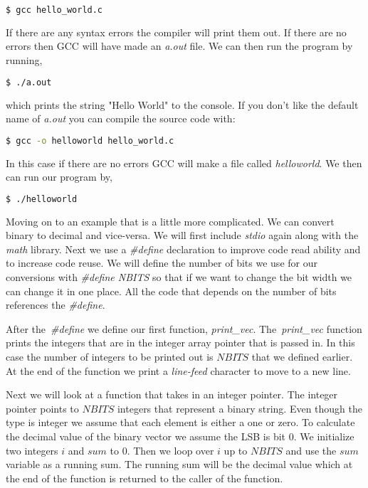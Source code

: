 \begin{lstlisting}[language=bash]
    $ gcc hello_world.c 
\end{lstlisting}

If there are any syntax errors the compiler will print them out. If there are no errors then \ac{GCC} will have made an \emph{a.out} file. We can then run the program by running,

\begin{lstlisting}[language=bash]
    $ ./a.out 
\end{lstlisting}

which prints the string "Hello World" to the console. If you don't like the default name of \emph{a.out} you can compile the source code with:

\begin{lstlisting}[language=bash]
    $ gcc -o helloworld hello_world.c 
\end{lstlisting}

In this case if there are no errors \ac{GCC} will make a file called \emph{helloworld}. We then can run our program by,

\begin{lstlisting}[language=bash]
    $ ./helloworld
\end{lstlisting}

Moving on to an example that is a little more complicated. We can convert binary to decimal and vice-versa. We will first include \emph{stdio} again along with the \emph{math} library. Next we use a \emph{\#define} declaration to improve code read ability and to increase code reuse. We will define the number of bits we use for our conversions with \emph{\#define NBITS} so that if we want to change the bit width we can change it in one place. All the code that depends on the number of bits references the \emph{\#define}.

After the \emph{\#define} we define our first function, \emph{print\_vec}. The \emph{print\_vec} function prints the integers that are in the integer array pointer that is passed in. In this case the number of integers to be printed out is $NBITS$ that we defined earlier. At the end of the function we print a \emph{line-feed} character to move to a new line. 

Next we will look at a function that takes in an integer pointer. The integer pointer points to $NBITS$ integers that represent a binary string. Even though the type is integer we assume that each element is either a one or zero. To calculate the decimal value of the binary vector we assume the \ac{LSB} is bit $0$. We initialize two integers $i$ and $sum$ to $0$. Then we loop over $i$ up to $NBITS$ and use the $sum$ variable as a running sum. The running sum will be the decimal value which at the end of the function is returned to the caller of the function. 

